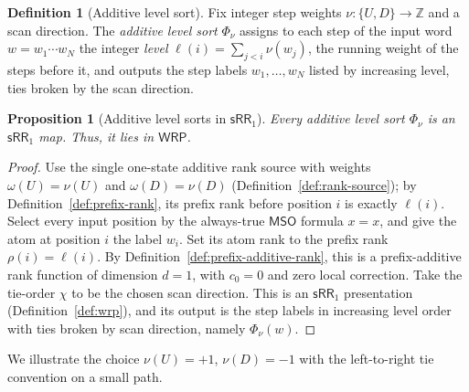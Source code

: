 \documentclass[11pt]{article}
\newtheorem{proposition}[theorem]{Proposition}
\theoremstyle{definition}
\newtheorem{definition}[theorem]{Definition}
\newcommand{\Z}{\mathbb Z}
\newcommand{\WRP}{\mathsf{WRP}}
\newcommand{\SWR}{\mathsf{sRR}_1}
\newcommand{\MSO}{\mathsf{MSO}}
\begin{document}
\begin{definition}[Additive level sort]\label{def:additive-sweep}
Fix integer step weights $\nu\colon\{U,D\}\to\Z$ and a scan direction.  The
\emph{additive level sort} $\Phi_\nu$ assigns to each step of the input
word $w=w_1\cdots w_N$ the integer \emph{level} $\ell(i)=\sum_{j<i}\nu(w_j)$,
the running weight of the steps before it, and outputs the step labels
$w_1,\ldots,w_N$ listed by increasing level, ties broken by the scan
direction.
\end{definition}

\begin{proposition}[Additive level sorts in $\SWR$]
\label{prop:alw-sweep-swr}
Every additive level sort $\Phi_\nu$ is an $\SWR$ map.  Thus, it
lies in $\WRP$.
\end{proposition}

\begin{proof}
Use the single one-state additive rank source with weights $\omega(U)=\nu(U)$
and $\omega(D)=\nu(D)$ (Definition~\ref{def:rank-source}); by
Definition~\ref{def:prefix-rank}, its prefix rank
before position $i$ is exactly $\ell(i)$.  Select every input position by the
always-true $\MSO$ formula $x=x$, and give the atom at position $i$ the label
$w_i$.  Set its atom rank to the prefix rank $\rho(i)=\ell(i)$.  By
Definition~\ref{def:prefix-additive-rank}, this is a prefix-additive rank
function of dimension $d=1$, with $c_0=0$ and zero local correction.  Take the
tie-order $\chi$ to be the chosen scan direction.  This is an $\SWR$
presentation (Definition~\ref{def:wrp}), and its output is the step labels in
increasing level order with ties broken by scan direction, namely
$\Phi_\nu(w)$.
\end{proof}

We illustrate the choice $\nu(U)=+1$, $\nu(D)=-1$ with the left-to-right tie
convention on a small path.
\end{document}
